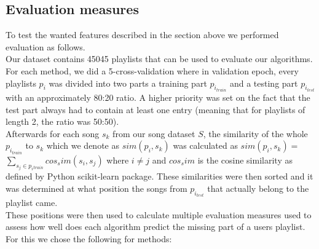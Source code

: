\subsection{Evaluation measures}
To test the wanted features described in the section above we performed evaluation as follows. \\
Our dataset contains 45045 playlists that can be used to evaluate our algorithms. For each method, we did a 5-cross-validation where in validation epoch, every playlists $p_i$ was divided into two parts a training part $p_{i_{train}}$ and a testing part $p_{i_{test}}$ with an approximately 80:20 ratio. A higher priority was set on the fact that the test part always had to contain at least one entry (meaning that for playlists of length 2, the ratio was 50:50). \\
Afterwards for each song $ s_k $ from our song dataset $S$, the similarity of the whole $p_{i_{train}}$ to $s_k$ which we denote as $ sim(p_i, s_k) $ was calculated as $sim(p_i, s_k) =$ $\sum_{s_j\in{p_i{_{train}}}} cos_sim(s_i, s_j) $ where $ i \neq j$ and $cos_sim$ is the cosine similarity as defined by Python scikit-learn package. These similarities were then sorted and it was determined at what position the songs from $p_{i_{test}} $ that actually belong to the playlist came. \\
These positions were then used to calculate multiple evaluation measures used to assess how well does each algorithm predict the missing part of a users playlist. For this we chose the following for methods:
